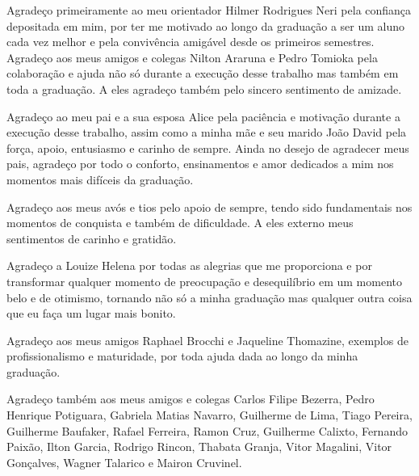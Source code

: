 \begin{agradecimentos}

Agradeço primeiramente ao meu orientador Hilmer Rodrigues Neri pela confiança depositada em mim, por ter me motivado ao longo da graduação a ser um aluno cada vez melhor e pela convivência amigável desde os primeiros semestres. Agradeço aos meus amigos e colegas Nilton Araruna e Pedro Tomioka pela colaboração e ajuda não só durante a execução desse trabalho mas também em toda a graduação. A eles agradeço também pelo sincero sentimento de amizade.

Agradeço ao meu pai e a sua esposa Alice pela paciência e motivação durante a execução desse trabalho, assim como a minha mãe e seu marido João David pela força, apoio, entusiasmo e carinho de sempre. Ainda no desejo de agradecer meus pais, agradeço por todo o conforto, ensinamentos e amor dedicados a mim nos momentos mais difíceis da graduação.

Agradeço aos meus avós e tios pelo apoio de sempre, tendo sido fundamentais nos momentos de conquista e também de dificuldade. A eles externo meus sentimentos de carinho e gratidão.

Agradeço a Louize Helena por todas as alegrias que me proporciona e por transformar qualquer momento de preocupação e desequilíbrio em um momento belo e de otimismo, tornando não só a minha graduação mas qualquer outra coisa que eu faça um lugar mais bonito. 

Agradeço aos meus amigos Raphael Brocchi e Jaqueline Thomazine, exemplos de profissionalismo e maturidade, por toda ajuda dada ao longo da minha graduação. 

Agradeço também aos meus amigos e colegas Carlos Filipe Bezerra, Pedro Henrique Potiguara, Gabriela Matias Navarro, Guilherme de Lima, Tiago Pereira, Guilherme Baufaker, Rafael Ferreira, Ramon Cruz, Guilherme Calixto, Fernando Paixão, Ilton Garcia, Rodrigo Rincon, Thabata Granja, Vitor Magalini, Vitor Gonçalves, Wagner Talarico e Mairon Cruvinel. 


\end{agradecimentos}
